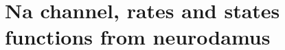 \documentclass{beamer}
\begin{document}
%
%
%
%
%


\section[Benchmark]{Na channel, rates and states functions from neurodamus}
\end{document}
